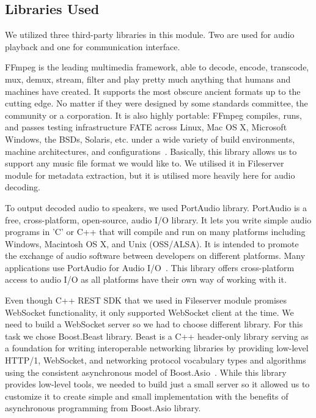 \subsection{Libraries Used}
We utilized three third-party libraries in this module. Two are used for audio playback and one for communication interface.
\par
FFmpeg is the leading multimedia framework, able to decode, encode, transcode, mux, demux, stream, filter and play pretty much anything that humans and machines have created. It supports the most obscure ancient formats up to the cutting edge. No matter if they were designed by some standards committee, the community or a corporation. It is also highly portable: FFmpeg compiles, runs, and passes testing infrastructure FATE across Linux, Mac OS X, Microsoft Windows, the BSDs, Solaris, etc. under a wide variety of build environments, machine architectures, and configurations~\citep{ffmpeg}. Basically, this library allows us to support any music file format we  would like to. We utilised it in Fileserver module for metadata extraction, but it is utilised more heavily here for audio decoding.
\par
To output decoded audio to speakers, we used PortAudio library. PortAudio is a free, cross-platform, open-source, audio I/O library. It lets you write simple audio programs in 'C' or C++ that will compile and run on many platforms including Windows, Macintosh OS X, and Unix (OSS/ALSA). It is intended to promote the exchange of audio software between developers on different platforms. Many applications use PortAudio for Audio I/O~\citep{portaudio}. This library offers cross-platform access to audio I/O as all platforms have their own way of working with it.
\par
Even though C++ REST SDK that we used in Fileserver module promises WebSocket functionality, it only supported WebSocket client at the time. We need to build a WebSocket server so we had to choose different library. For this task we chose Boost.Beast library. Beast is a C++ header-only library serving as a foundation for writing interoperable networking libraries by providing low-level HTTP/1, WebSocket, and networking protocol vocabulary types and algorithms using the consistent asynchronous model of Boost.Asio~\citep{beast}. While this library provides low-level tools, we needed to build just a small server so it allowed us to customize it to create simple and small implementation with the benefits of asynchronous programming from Boost.Asio library.

